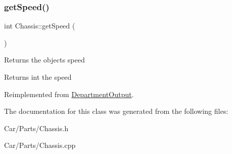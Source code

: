 \subsubsection{\texorpdfstring{get\+Speed()}{getSpeed()}}
{\footnotesize\ttfamily int Chassis\+::get\+Speed (\begin{DoxyParamCaption}{ }\end{DoxyParamCaption})\hspace{0.3cm}{\ttfamily [virtual]}}

Returns the objects speed \begin{DoxyReturn}{Returns}
int the speed 
\end{DoxyReturn}


Reimplemented from \hyperlink{classDepartmentOutput_a90caf8934a687d18b9855f19a421ecef}{Department\+Output}.



The documentation for this class was generated from the following files\+:\begin{DoxyCompactItemize}
\item 
Car/\+Parts/Chassis.\+h\item 
Car/\+Parts/Chassis.\+cpp\end{DoxyCompactItemize}
